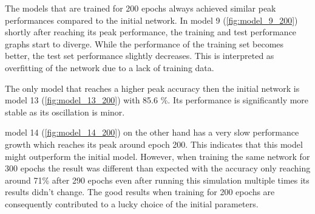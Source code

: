 \documentclass[
a4paper, 
12pt,
grayscalebody, %
abstract=on,
twoside, BCOR10mm, 12pt, DIV13,headinclude, footexclude, final, abstracton, openright
]{ibireprt}
\numberwithin{equation}{chapter}
\numberwithin{table}{chapter}
\numberwithin{figure}{chapter}
\numberwithin{algorithm}{chapter}
\numberwithin{example}{chapter}
\numberwithin{example}{chapter}
\begin{document}
The models that are trained for 200 epochs always achieved similar peak performances compared to the initial network. In model 9 (\ref{fig:model_9_200}) shortly after reaching its peak performance, the training and test performance graphs start to diverge. While the performance of the training set becomes better, the test set performance slightly decreases. This is interpreted as overfitting of the network due to a lack of training data.

The only model that reaches a higher peak accuracy then the initial network is model 13 (\ref{fig:model_13_200}) with 85.6 \%. Its performance is significantly more stable as its oscillation is minor.

model 14 (\ref{fig:model_14_200}) on the other hand has a very slow performance growth which reaches its peak around epoch 200. This indicates that this model might outperform the initial model. However, when training the same network for 300 epochs the result was different than expected with the accuracy only reaching around 71\% after 290 epochs even after running this simulation multiple times its results didn't change. The good results when training for 200 epochs are consequently contributed to a lucky choice of the initial parameters.
\end{document}
